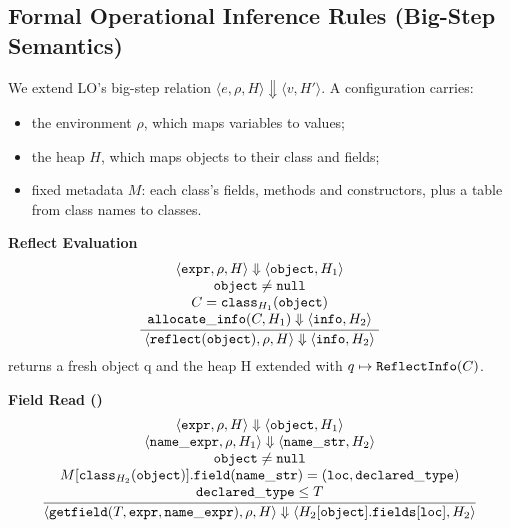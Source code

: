 \subsection*{Formal Operational Inference Rules (Big-Step Semantics)}
We extend LO's big-step relation
$\langle e, \rho, H\rangle \Downarrow \langle v, H'\rangle$. A configuration
carries:
\begin{itemize}
  \item[--] the environment $\rho$, which maps variables to values;
  \item[--] the heap $H$, which maps objects to their class and fields;
  \item[--] fixed metadata $M$: each class's fields, methods and constructors,
    plus a table from class names to classes.
\end{itemize}

\textbf{Reflect Evaluation}
\[
\dfrac{\begin{array}{c}
  \langle \mathtt{expr}, \rho, H\rangle \Downarrow \langle \mathtt{object}, H_1\rangle \\
  \mathtt{object} \neq \mathtt{null} \\
  C = \mathtt{class}_{H_1}(\mathtt{object}) \\
  \mathtt{allocate\_info}(C, H_1) \Downarrow \langle \mathtt{info}, H_2\rangle
\end{array}}{
  \langle \mathtt{reflect}(\mathtt{object}), \rho, H\rangle \Downarrow \langle \mathtt{info}, H_2\rangle
}
\]
{\small *\textbf{} returns a fresh object q and the
heap H extended with $q \mapsto \mathtt{ReflectInfo}(C)$.}

\textbf{Field Read ()}
\[
\dfrac{\begin{array}{c}
  \langle \mathtt{expr}, \rho, H\rangle \Downarrow \langle \mathtt{object}, H_1\rangle \\
  \langle \mathtt{name\_expr}, \rho, H_1\rangle \Downarrow \langle \mathtt{name\_str}, H_2\rangle \\
  \mathtt{object} \neq \mathtt{null} \\
  M[\mathtt{class}_{H_2}(\mathtt{object})].\mathtt{field}(\mathtt{name\_str}) = (\mathtt{loc}, \mathtt{declared\_type}) \\
  \mathtt{declared\_type} \le T
\end{array}}{
  \langle \mathtt{getfield}(T, \mathtt{expr}, \mathtt{name\_expr}), \rho, H\rangle \Downarrow
  \langle H_2[\mathtt{object}].\mathtt{fields}[\mathtt{loc}], H_2\rangle
}
\]

